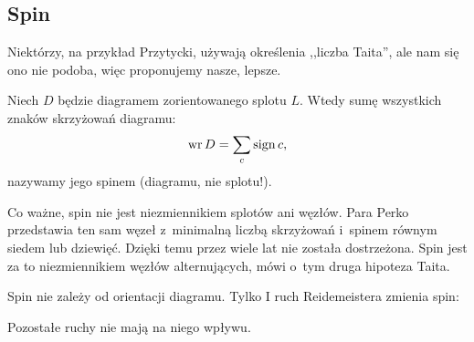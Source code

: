 
\subsection{Spin}
%

Niektórzy, na przykład Przytycki, używają określenia ,,liczba Taita'', ale nam się ono nie podoba, więc proponujemy nasze, lepsze.
%

\begin{definition}[spin]
    Niech $D$ będzie diagramem zorientowanego splotu $L$.
    Wtedy sumę wszystkich znaków skrzyżowań diagramu:
    \begin{equation}
        \operatorname{wr} D = \sum_c \operatorname{sign} c,
    \end{equation}
    nazywamy jego spinem (diagramu, nie splotu!).
\end{definition}

Co ważne, spin nie jest niezmiennikiem splotów ani węzłów.
Para Perko przedstawia ten sam węzeł z~minimalną liczbą skrzyżowań i~spinem równym siedem lub dziewięć.
%
Dzięki temu przez wiele lat nie została dostrzeżona.
Spin jest za to niezmiennikiem węzłów alternujących, mówi o~tym druga hipoteza Taita.
%

\begin{lemma}
\label{lem:writhe_reidemeister}%
    Spin nie zależy od orientacji diagramu.
    Tylko I ruch Reidemeistera zmienia spin:
\begin{comment}
    \begin{equation}
        \writhe \left(\MedLarReidemeisterOneLeft\right) =
        \writhe \left(\MedLarReidemeisterOneStraight\right) - 1.
    \end{equation}
\end{comment}
    Pozostałe ruchy nie mają na niego wpływu.
\end{lemma}

%

